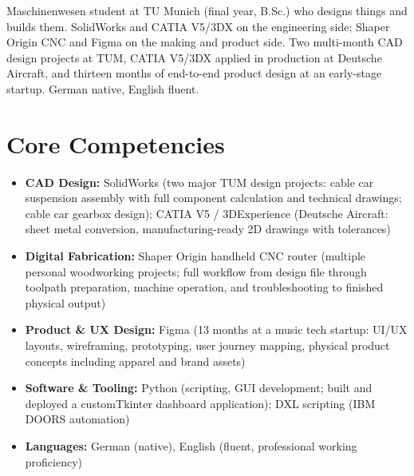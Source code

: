 \documentclass[11pt,a4paper,sans]{moderncv}
\begin{document}
\makecvtitle


\vspace{6pt}
\small{Maschinenwesen student at TU Munich (final year, B.Sc.) who designs things and builds them. SolidWorks and CATIA V5/3DX on the engineering side; Shaper Origin CNC and Figma on the making and product side. Two multi-month CAD design projects at TUM, CATIA V5/3DX applied in production at Deutsche Aircraft, and thirteen months of end-to-end product design at an early-stage startup. German native, English fluent.}


\section{Core Competencies}
\vspace{1pt}
\begin{itemize}

\item \textbf{CAD Design:} SolidWorks (two major TUM design projects: cable car suspension assembly with full component calculation and technical drawings; cable car gearbox design); CATIA V5 / 3DExperience (Deutsche Aircraft: sheet metal conversion, manufacturing-ready 2D drawings with tolerances)

\item \textbf{Digital Fabrication:} Shaper Origin handheld CNC router (multiple personal woodworking projects; full workflow from design file through toolpath preparation, machine operation, and troubleshooting to finished physical output)

\item \textbf{Product \& UX Design:} Figma (13 months at a music tech startup: UI/UX layouts, wireframing, prototyping, user journey mapping, physical product concepts including apparel and brand assets)

\item \textbf{Software \& Tooling:} Python (scripting, GUI development; built and deployed a customTkinter dashboard application); DXL scripting (IBM DOORS automation)

\item \textbf{Languages:} German (native), English (fluent, professional working proficiency)

\end{itemize}
\end{document}
